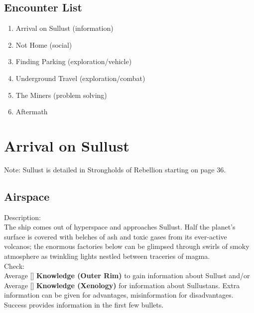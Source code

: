\documentclass{book}
\newcommand{\df}{\difficulty}
\begin{document}
\begin{multicols*}{2}
\subsection{Encounter List}
\begin{enumerate}
    \item Arrival on Sullust (information)
    \item Not Home (social)
    \item Finding Parking (exploration/vehicle)
    \item Underground Travel (exploration/combat)
    \item The Miners (problem solving)
    \item Aftermath
\end{enumerate}

\section{Arrival on Sullust}

Note: Sullust is detailed in Strongholds of Rebellion starting on page 36.

\subsection{Airspace}

Description:\\
The ship comes out of hyperspace and approaches Sullust. Half the planet’s surface is covered with belches of ash and toxic gases from its ever-active volcanos; the enormous factories below can be glimpsed through swirls of smoky atmosphere as twinkling lights nestled between traceries of magma.\\
Check:\\
Average [\df\df] \textbf{Knowledge (Outer Rim)} to gain information about Sullust and/or Average [\df\df] \textbf{Knowledge (Xenology)} for information about Sullustans. Extra information can be given for advantages, misinformation for disadvantages. Success provides information in the first few bullets.\\


\end{multicols*}
\end{document}
